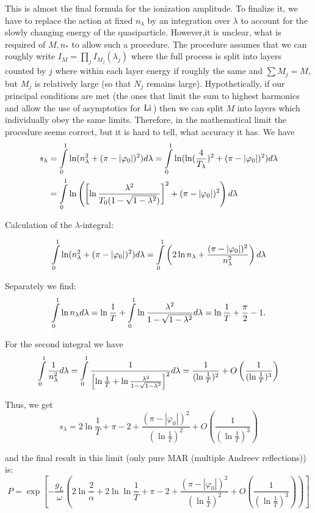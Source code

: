 This is almost the final formula for the ionization amplitude. To
finalize it, we have to replace the action at fixed $n_{\lambda}$
by an integration over $\lambda$ to account for the slowly changing
energy of the quasiparticle. However,it is unclear, what is required
of $M,n_{*}$ to allow such a procedure. The procedure assumes that
we can roughly write $I_{M}=\prod_{j}I_{M_{j}}(\lambda_{j})$ where
the full process is split into layers counted by $j$ where within
each layer energy if roughly the same and $\sum M_{j}=M$, but $M_{j}$
is relatively large (so that $N_{j}$ remains large). Hypothetically,
if our principal conditions are met (the ones that limit the sum to
highest harmonics and allow the use of asymptotics for $\mathrm{Li}\,$) then
we can split $M$ into layers which individually obey the same limits.
Therefore, in the mathematical limit the procedure seems correct,
but it is hard to tell, what accuracy it has. We have
\begin{align*}
s_{\lambda} & =\intop_{0}^{1}\ln(n_{\lambda}^{2}+(\pi-|\varphi_{0}|)^{2})d\lambda=\intop_{0}^{1}\ln(\ln(\frac{4}{T_{\lambda}})^{2}+(\pi-|\varphi_{0}|)^{2})d\lambda\\
& =\intop_{0}^{1}\ln\left(\left[\ln\frac{\lambda^{2}}{T_{0}(1-\sqrt{1-\lambda^{2}})}\right]^{2}+(\pi-|\varphi_{0}|)^{2}\right)d\lambda
\end{align*}

Calculation of the $\lambda$-integral:

\[
\intop_{0}^{1}\ln(n_{\lambda}^{2}+(\pi-|\varphi_{0}|)^{2})d\lambda=\intop_{0}^{1}\left(2\ln n_{\lambda}+\frac{(\pi-|\varphi_{0}|)^{2}}{n_{\lambda}^{2}}\right)d\lambda
\]

Separately we find:
\[
\intop_{0}^{1}\ln n_{\lambda}d\lambda=\ln\frac{1}{T}+\intop_{0}^{1}\ln\frac{\lambda^{2}}{1-\sqrt{1-\lambda^{2}}}d\lambda=\ln\frac{1}{T}+\frac{\pi}{2}-1.
\]

For the second integral we have
\[
\intop_{0}^{1}\frac{1}{n_{\lambda}^{2}}d\lambda=\intop_{0}^{1}\frac{1}{\left[\ln\frac{1}{T}+\ln\frac{\lambda^{2}}{1-\sqrt{1-\lambda^{2}}}\right]^{2}}d\lambda=\frac{1}{(\ln\frac{1}{T})^{2}}+O\left(\frac{1}{(\ln\frac{1}{T})^{3}}\right)
\]

Thus, we get 
\[
s_{\lambda}=2\ln\frac{1}{T}+\pi-2+\frac{(\pi-|\varphi_{0}|)^{2}}{(\ln\frac{1}{T})^{2}}+O\left(\frac{1}{(\ln\frac{1}{T})^{3}}\right)
\]

and the final result in this limit (only pure MAR (multiple Andreev
reflections)) is:
\[
P=\exp\left[-\frac{g_{L}}{\omega}\left(2\ln\frac{2}{\alpha}+2\ln\ln\frac{1}{T}+\pi-2+\frac{(\pi-|\varphi_{0}|)^{2}}{(\ln\frac{1}{T})^{2}}+O\left(\frac{1}{(\ln\frac{1}{T})^{3}}\right)\right)\right]
\]

